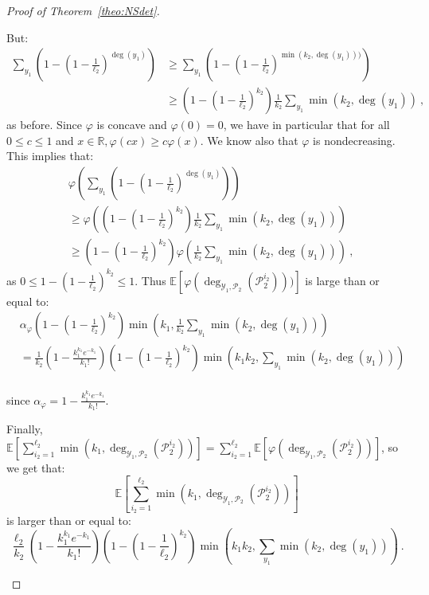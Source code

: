 \begin{proof}[Proof of Theorem~\ref{theo:NSdet}]
\begin{enumerate}
But:
\begin{equation}
  \begin{aligned}
    \sum_{y_1}\left(1-\left(1-\frac{1}{\ell_2}\right)^{\deg(y_1)}\right) &\geq \sum_{y_1}\left(1-\left(1-\frac{1}{\ell_2}\right)^{\min\left(k_2,\deg(y_1)\right))}\right)\\
    &\geq \left(1-\left(1-\frac{1}{\ell_2}\right)^{k_2}\right)\frac{1}{k_2}\sum_{y_1}\min\left(k_2,\deg(y_1)\right) \ ,
  \end{aligned}
\end{equation}
as before. Since $\varphi$ is concave and $\varphi(0)=0$, we have in particular that for all $0 \leq c \leq 1$ and $x \in \mathbb{R}, \varphi(cx)\geq c\varphi(x)$. We know also that $\varphi$ is nondecreasing. This implies that:
\begin{equation}
  \begin{aligned}
    &\varphi\left(\sum_{y_1}\left(1-\left(1-\frac{1}{\ell_2}\right)^{\deg(y_1)}\right)\right)\\
    &\geq \varphi\left(\left(1-\left(1-\frac{1}{\ell_2}\right)^{k_2}\right)\frac{1}{k_2}\sum_{y_1}\min\left(k_2,\deg(y_1)\right)\right) \\
&\geq \left(1-\left(1-\frac{1}{\ell_2}\right)^{k_2}\right)\varphi\left(\frac{1}{k_2}\sum_{y_1}\min\left(k_2,\deg(y_1)\right)\right) \ ,
  \end{aligned}
\end{equation}
as $0 \leq 1-\left(1-\frac{1}{\ell_2}\right)^{k_2} \leq 1$. Thus $\mathbb{E}\left[\varphi(\deg_{\mathcal{Y}_1,\mathcal{P}_2}(\mathcal{P}_2^{i_2})))\right]$ is large than or equal to:
\begin{equation}
  \begin{aligned}
    &\alpha_{\varphi}\left(1-\left(1-\frac{1}{\ell_2}\right)^{k_2}\right)\min\left(k_1,\frac{1}{k_2}\sum_{y_1}\min\left(k_2,\deg(y_1)\right)\right)\\
    &= \frac{1}{k_2}\left(1 - \frac{k_1^{k_1}e^{-k_1}}{k_1!}\right)\left(1-\left(1-\frac{1}{\ell_2}\right)^{k_2}\right)\min\left(k_1k_2,\sum_{y_1}\min\left(k_2,\deg(y_1)\right)\right)\\
  \end{aligned}
\end{equation}

since $\alpha_{\varphi} = 1 - \frac{k_1^{k_1}e^{-k_1}}{k_1!}$.

Finally, $\mathbb{E}\left[\sum_{i_2=1}^{\ell_2}\min\left(k_1,\deg_{\mathcal{Y}_1,\mathcal{P}_2}(\mathcal{P}_2^{i_2})\right)\right] = \sum_{i_2=1}^{\ell_2}\mathbb{E}\left[\varphi(\deg_{\mathcal{Y}_1,\mathcal{P}_2}(\mathcal{P}_2^{i_2}))\right]$, so we get that:
\[ \mathbb{E}\left[\sum_{i_2=1}^{\ell_2}\min\left(k_1,\deg_{\mathcal{Y}_1,\mathcal{P}_2}(\mathcal{P}_2^{i_2})\right)\right] \]
is larger than or equal to:
\[ \frac{\ell_2}{k_2}\left(1 - \frac{k_1^{k_1}e^{-k_1}}{k_1!}\right)\left(1-\left(1-\frac{1}{\ell_2}\right)^{k_2}\right)\min\left(k_1k_2,\sum_{y_1}\min\left(k_2,\deg(y_1)\right)\right) \ . \]


\end{enumerate}
\end{proof}

